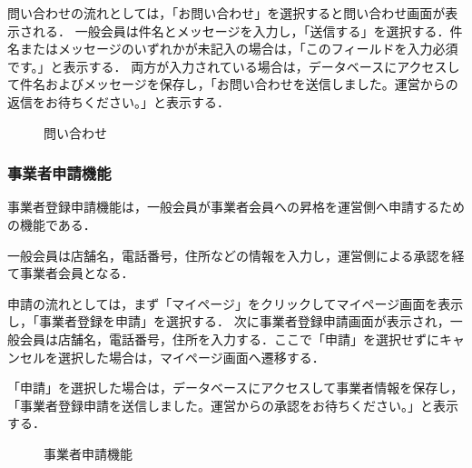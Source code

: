 問い合わせの流れとしては，「お問い合わせ」を選択すると問い合わせ画面が表示される．
一般会員は件名とメッセージを入力し，「送信する」を選択する．件名またはメッセージのいずれかが未記入の場合は，「このフィールドを入力必須です。」と表示する．
両方が入力されている場合は，データベースにアクセスして件名およびメッセージを保存し，「お問い合わせを送信しました。運営からの返信をお待ちください。」と表示する．

\begin{figure}[H]
    \centering
    
    \caption{問い合わせ}
\end{figure}

\subsubsection{事業者申請機能}
事業者登録申請機能は，一般会員が事業者会員への昇格を運営側へ申請するための機能である．

一般会員は店舗名，電話番号，住所などの情報を入力し，運営側による承認を経て事業者会員となる．

申請の流れとしては，まず「マイページ」をクリックしてマイページ画面を表示し，「事業者登録を申請」を選択する．
次に事業者登録申請画面が表示され，一般会員は店舗名，電話番号，住所を入力する．ここで「申請」を選択せずにキャンセルを選択した場合は，マイページ画面へ遷移する．

「申請」を選択した場合は，データベースにアクセスして事業者情報を保存し，「事業者登録申請を送信しました。運営からの承認をお待ちください。」と表示する．



\begin{figure}[H]
    \centering
    

    \caption{事業者申請機能}
\end{figure}



